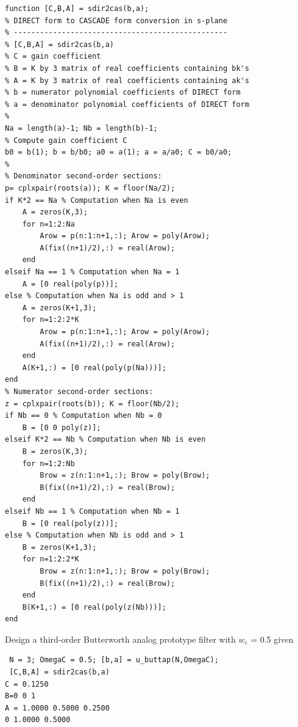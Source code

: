 \documentclass{article}
\begin{document}
\begin{lstlisting}
function [C,B,A] = sdir2cas(b,a);
% DIRECT form to CASCADE form conversion in s-plane
% -------------------------------------------------
% [C,B,A] = sdir2cas(b,a)
% C = gain coefficient
% B = K by 3 matrix of real coefficients containing bk's
% A = K by 3 matrix of real coefficients containing ak's
% b = numerator polynomial coefficients of DIRECT form
% a = denominator polynomial coefficients of DIRECT form
%
Na = length(a)-1; Nb = length(b)-1;
% Compute gain coefficient C
b0 = b(1); b = b/b0; a0 = a(1); a = a/a0; C = b0/a0;
%
% Denominator second-order sections:
p= cplxpair(roots(a)); K = floor(Na/2);
if K*2 == Na % Computation when Na is even
    A = zeros(K,3);
    for n=1:2:Na
        Arow = p(n:1:n+1,:); Arow = poly(Arow);
        A(fix((n+1)/2),:) = real(Arow);
    end
elseif Na == 1 % Computation when Na = 1
    A = [0 real(poly(p))];
else % Computation when Na is odd and > 1
    A = zeros(K+1,3);
    for n=1:2:2*K
        Arow = p(n:1:n+1,:); Arow = poly(Arow);
        A(fix((n+1)/2),:) = real(Arow);
    end
    A(K+1,:) = [0 real(poly(p(Na)))];
end
% Numerator second-order sections:
z = cplxpair(roots(b)); K = floor(Nb/2);
if Nb == 0 % Computation when Nb = 0
    B = [0 0 poly(z)];
elseif K*2 == Nb % Computation when Nb is even
    B = zeros(K,3);
    for n=1:2:Nb
        Brow = z(n:1:n+1,:); Brow = poly(Brow);
        B(fix((n+1)/2),:) = real(Brow);
    end
elseif Nb == 1 % Computation when Nb = 1
    B = [0 real(poly(z))];
else % Computation when Nb is odd and > 1
    B = zeros(K+1,3);
    for n=1:2:2*K
        Brow = z(n:1:n+1,:); Brow = poly(Brow);
        B(fix((n+1)/2),:) = real(Brow);
    end
    B(K+1,:) = [0 real(poly(z(Nb)))];
end
\end{lstlisting}
 Design a third-order Butterworth analog prototype filter with $w_c$ = 0.5 given
\begin{lstlisting}
 N = 3; OmegaC = 0.5; [b,a] = u_buttap(N,OmegaC);
 [C,B,A] = sdir2cas(b,a)
C = 0.1250
B=0 0 1
A = 1.0000 0.5000 0.2500
0 1.0000 0.5000
\end{lstlisting}
\end{document}
